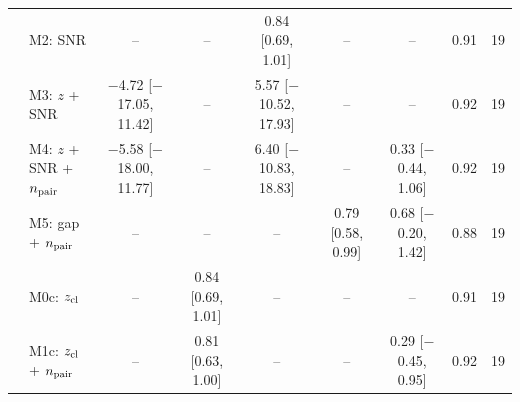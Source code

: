 \begin{tabular}{llcccccrr}
 & M2: SNR & -- & -- & 0.84 [0.69, 1.01] & -- & -- & 0.91 & 19 \\
 & M3: $z$ + SNR & $-$4.72 [$-$17.05, 11.42] & -- & 5.57 [$-$10.52, 17.93] & -- & -- & 0.92 & 19 \\
 & M4: $z$ + SNR + $n_{\rm pair}$ & $-$5.58 [$-$18.00, 11.77] & -- & 6.40 [$-$10.83, 18.83] & -- & 0.33 [$-$0.44, 1.06] & 0.92 & 19 \\
 & M5: gap + $n_{\rm pair}$ & -- & -- & -- & 0.79 [0.58, 0.99] & 0.68 [$-$0.20, 1.42] & 0.88 & 19 \\
 & M0c: $z_{\rm cl}$ & -- & 0.84 [0.69, 1.01] & -- & -- & -- & 0.91 & 19 \\
 & M1c: $z_{\rm cl}$ + $n_{\rm pair}$ & -- & 0.81 [0.63, 1.00] & -- & -- & 0.29 [$-$0.45, 0.95] & 0.92 & 19 \\
\bottomrule
\end{tabular}
